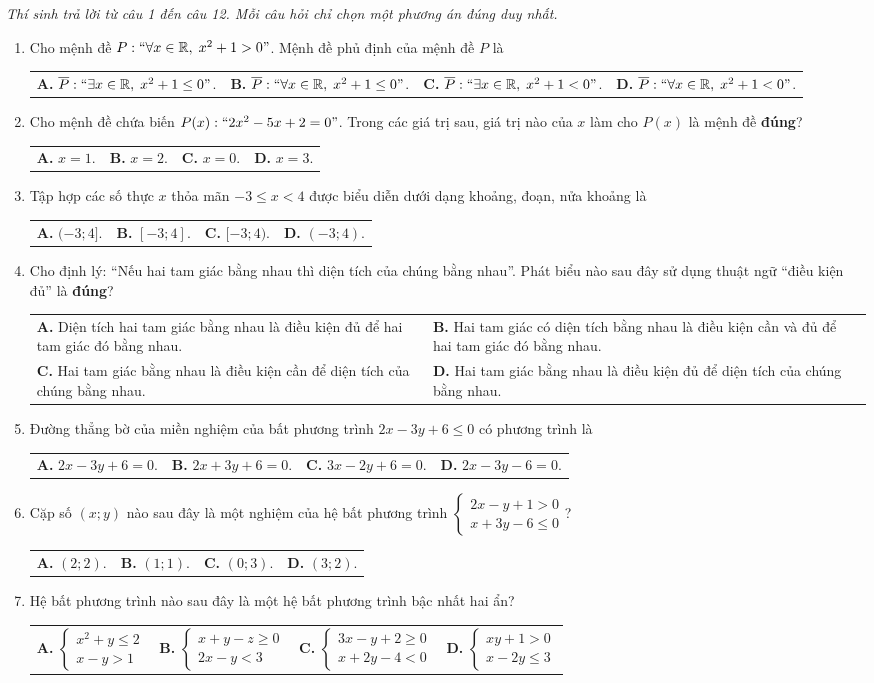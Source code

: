\documentclass[12pt,a4paper]{article}
\makeatletter
\newcommand{\parttitle}[1]{\par\vspace{2pt}{\large\bfseries\color{ink}#1}\par\vspace{1pt}}
\newcommand{\four}[4]{\par\noindent\begin{tabularx}{\linewidth}{@{}*{4}{>{\raggedright\arraybackslash}X}@{}}\textbf{A.} #1&\textbf{B.} #2&\textbf{C.} #3&\textbf{D.} #4\end{tabularx}}
\newcommand{\two}[4]{\par\noindent\begin{tabularx}{\linewidth}{@{}*{2}{>{\raggedright\arraybackslash}X}@{}}\textbf{A.} #1&\textbf{B.} #2\\[2pt]\textbf{C.} #3&\textbf{D.} #4\end{tabularx}}
\makeatother
\begin{document}
\parttitle{PHẦN I. Trắc nghiệm nhiều lựa chọn}
\textit{Thí sinh trả lời từ câu 1 đến câu 12. Mỗi câu hỏi chỉ chọn một phương án đúng duy nhất.}
\begin{enumerate}
\item Cho mệnh đề $P: ``\forall x \in \mathbb{R},\; x^2 + 1 > 0"$. Mệnh đề phủ định của mệnh đề $P$ là
\four{$\overline{P}: ``\exists x \in \mathbb{R},\; x^2 + 1 \le 0"$.}{$\overline{P}: ``\forall x \in \mathbb{R},\; x^2 + 1 \le 0"$.}{$\overline{P}: ``\exists x \in \mathbb{R},\; x^2 + 1 < 0"$.}{$\overline{P}: ``\forall x \in \mathbb{R},\; x^2 + 1 < 0"$.}

\item Cho mệnh đề chứa biến $P(x): ``2x^2 - 5x + 2 = 0"$. Trong các giá trị sau, giá trị nào của $x$ làm cho $P(x)$ là mệnh đề \textbf{đúng}?
\four{$x = 1$.}{$x = 2$.}{$x = 0$.}{$x = 3$.}

\item Tập hợp các số thực $x$ thỏa mãn $-3 \le x < 4$ được biểu diễn dưới dạng khoảng, đoạn, nửa khoảng là
\four{$(-3; 4]$.}{$[-3; 4]$.}{$[-3; 4)$.}{$(-3; 4)$.}

\item Cho định lý: ``Nếu hai tam giác bằng nhau thì diện tích của chúng bằng nhau''. Phát biểu nào sau đây sử dụng thuật ngữ ``điều kiện đủ'' là \textbf{đúng}?
\two{Diện tích hai tam giác bằng nhau là điều kiện đủ để hai tam giác đó bằng nhau.}{Hai tam giác có diện tích bằng nhau là điều kiện cần và đủ để hai tam giác đó bằng nhau.}{Hai tam giác bằng nhau là điều kiện cần để diện tích của chúng bằng nhau.}{Hai tam giác bằng nhau là điều kiện đủ để diện tích của chúng bằng nhau.}

\item Đường thẳng bờ của miền nghiệm của bất phương trình $2x - 3y + 6 \le 0$ có phương trình là
\four{$2x - 3y + 6 = 0$.}{$2x + 3y + 6 = 0$.}{$3x - 2y + 6 = 0$.}{$2x - 3y - 6 = 0$.}

\item Cặp số $(x; y)$ nào sau đây là một nghiệm của hệ bất phương trình $\begin{cases} 2x - y + 1 > 0 \\ x + 3y - 6 \le 0 \end{cases}$?
\four{$(2; 2)$.}{$(1; 1)$.}{$(0; 3)$.}{$(3; 2)$.}

\item Hệ bất phương trình nào sau đây là một hệ bất phương trình bậc nhất hai ẩn?
\four{$\begin{cases} x^2 + y \le 2 \\ x - y > 1 \end{cases}$}{$\begin{cases} x + y - z \ge 0 \\ 2x - y < 3 \end{cases}$}{$\begin{cases} 3x - y + 2 \ge 0 \\ x + 2y - 4 < 0 \end{cases}$}{$\begin{cases} xy + 1 > 0 \\ x - 2y \le 3 \end{cases}$}


\end{enumerate}
\end{document}
